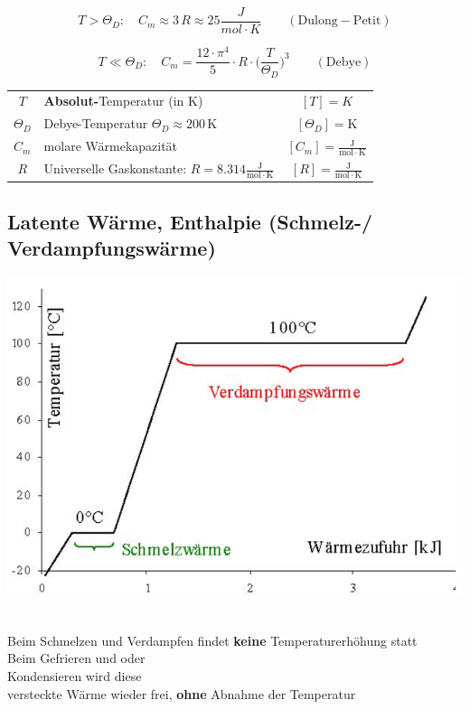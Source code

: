 $$ T > \Theta_D: \quad C_m \approx 3 \, R \approx 25 \frac{J}{mol \cdot K}  \qquad \mathrm{(Dulong-Petit)}$$

$$ T \ll \Theta_D: \quad C_m = \frac{12 \cdot \pi^4}{5}  \cdot R \cdot  \Big( \frac{T}{\Theta_D}  \Big)^3 \qquad \mathrm{(Debye)}  $$


\begin{tabular}{c l c}
	$T$ & \textbf{Absolut-}Temperatur (in K) & $[T] = K$ \\
	$\Theta_D$ & Debye-Temperatur $\Theta_D \approx 200 \, \mathrm{K}$ & $[\Theta_D] = \mathrm{K}$ \\
	\rule{0pt}{8pt}$C_m$ & molare Wärmekapazität & $[C_m] = \mathrm{\frac{J}{mol \cdot K}}$ \\
	\rule{0pt}{8pt}$R$ & Universelle Gaskonstante: $R = 8.314 \mathrm{\frac{J}{mol \cdot K}}$ & $[R] = \mathrm{\frac{J}{mol \cdot K}} $ \\
\end{tabular}






\subsection{Latente Wärme, Enthalpie (Schmelz-/ Verdampfungswärme)}



\begin{minipage}{0.5\linewidth}
\includegraphics[width=0.99\linewidth]{Bilder/latente_waerme_2}\\
\\
\end{minipage}
\hfill
\begin{minipage}{0.5\linewidth}
Beim Schmelzen und Verdampfen findet \textbf{keine} Temperaturerhöhung statt \\
Beim Gefrieren und oder \\
Kondensieren wird diese \\
versteckte Wärme wieder frei, \textbf{ohne} Abnahme der Temperatur \\
\\
\end{minipage}


